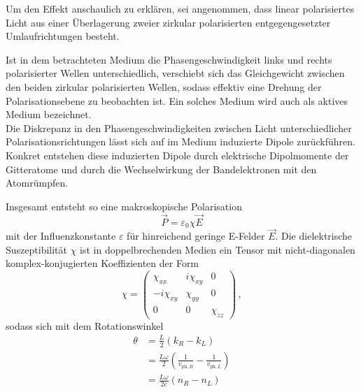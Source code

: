Um den Effekt anschaulich zu erklären, sei angenommen, dass linear polarisiertes Licht aus einer Überlagerung zweier zirkular polarisierten
entgegengesetzter Umlaufrichtungen besteht.

Ist in dem betrachteten Medium die Phasengeschwindigkeit links und rechts polarisierter Wellen unterschiedlich, verschiebt sich das Gleichgewicht zwischen
den beiden zirkular polarisierten Wellen, sodass effektiv eine Drehung der Polarisationsebene zu beobachten ist.
Ein solches Medium wird auch als aktives Medium bezeichnet. \\

Die Diskrepanz in den Phasengeschwindigkeiten zwischen Licht unterschiedlicher Polarisationsrichtungen lässt sich auf im Medium induzierte Dipole zurückführen.
Konkret entstehen diese induzierten Dipole durch elektrische Dipolmomente der Gitteratome und durch die Wechselwirkung der Bandelektronen mit den Atomrümpfen.

Insgesamt entsteht so eine makroskopische Polarisation
\begin{equation}
    \vec{P} = \varepsilon_0 \chi \vec{E}
    \label{eq:polarisation} 
\end{equation}
mit der Influenzkonstante $\varepsilon$ für hinreichend geringe E-Felder $\vec{E}$.
Die dielektrische Suszeptibilität $\chi$ ist in doppelbrechenden Medien ein Tensor mit nicht-diagonalen komplex-konjugierten Koeffizienten der Form
\begin{equation*}
    \chi = \left( \begin{matrix}
        \chi_{xx}     & i\chi_{xy}    & 0 \\
        - i \chi_{xy} & \chi_{yy}     & 0 \\
        0             & 0             & \chi_{zz}
    \end{matrix}\right) \,,
\end{equation*}
sodass sich mit dem Rotationswinkel 
\begin{align*}
    \theta &= \frac{L}{2} (k_R - k_L) \\
           &= \frac{L \omega}{2} \left(\frac{1}{v_{\text{ph},R}} - \frac{1}{v_{\text{ph},L}}\right) \\
           &= \frac{L \omega}{2 c} (n_R - n_L)
\end{align*}



